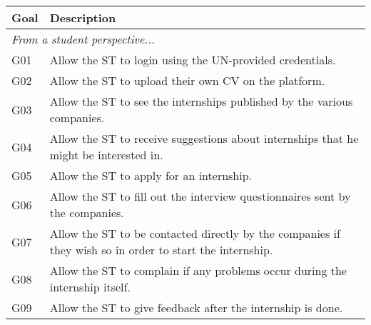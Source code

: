 \begin{table}[H]
    \centering
    \begin{longtable}{|l|p{}|}
        \hline
        \textbf{Goal} & \textbf{Description}                                                                                                                              \\
        \hline \hline
        \multicolumn{2}{|l|}{\textit{From a student perspective...}}                                                                                                      \\
        \hline
        G01           & Allow the ST to login using the UN-provided credentials.                                                                                          \\
        \hline
        G02           & Allow the ST to upload their own CV on the platform.                                                                                              \\
        \hline
        G03           & Allow the ST to see the internships published by the various companies.                                                                           \\
        \hline
        G04           & Allow the ST to receive suggestions about internships that he might be interested in.                                                             \\
        \hline
        G05           & Allow the ST to apply for an internship.                                                                                                          \\
        \hline
        G06           & Allow the ST to fill out the interview questionnaires sent by the companies.                                                                      \\
        \hline
        G07           & Allow the ST to be contacted directly by the companies if they wish so in order to start the internship.                                          \\
        \hline
        G08           & Allow the ST to complain if any problems occur during the internship itself.                                                                      \\
        \hline
        G09           & Allow the ST to give feedback after the internship is done.                                                                                       \\

\end{longtable}
\end{table}
